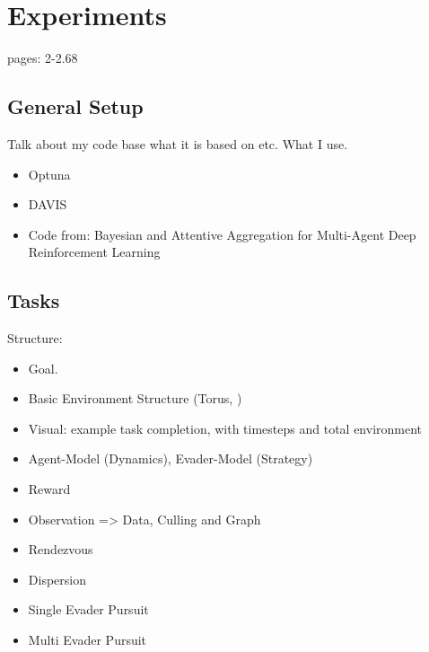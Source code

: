 
\chapter{Experiments}
\label{ch:Experiments}
pages: 2-2.68
\section{General Setup}
Talk about my code base what it is based on etc. What I use.
\begin{itemize}[noitemsep,nolistsep]
    \item Optuna
    \item DAVIS
    \item Code from: Bayesian and Attentive Aggregation for Multi-Agent Deep Reinforcement Learning
\end{itemize} 

\section{Tasks}
Structure:
\begin{itemize}[noitemsep,nolistsep]
    \item Goal.
    \item Basic Environment Structure (Torus, )
    \item Visual: example task completion, with timesteps and total environment
    \item Agent-Model (Dynamics), Evader-Model (Strategy)
    \item Reward
    \item Observation => Data, Culling and Graph
\end{itemize} 
\begin{itemize}[noitemsep,nolistsep]
    \item Rendezvous
    \item Dispersion
    \item Single Evader Pursuit
    \item Multi Evader Pursuit
\end{itemize} 

